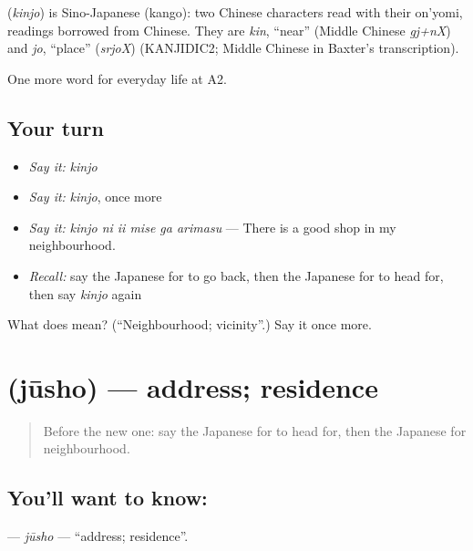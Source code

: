 \begin{cousinweb}
\textbf{} (\emph{kinjo}) is Sino-Japanese (kango): two Chinese characters read with their on'yomi, readings borrowed from Chinese. They are \emph{kin}, \textquotedblleft{}near\textquotedblright{} (Middle Chinese \emph{gj+nX}) and \emph{jo}, \textquotedblleft{}place\textquotedblright{} (\emph{srjoX}) (KANJIDIC2; Middle Chinese in Baxter's transcription).
\end{cousinweb}

\begin{grammarlens}[title={What you've built}]
One more word for everyday life at A2.
\end{grammarlens}

\subsection*{Your turn}
\begin{itemize}
\raggedright
  \item \emph{Say it:} \emph{kinjo}
  \item \emph{Say it:} \emph{kinjo}, once more
  \item \emph{Say it:} \emph{kinjo ni ii mise ga arimasu} — There is a good shop in my neighbourhood.
  \item \emph{Recall:} say the Japanese for to go back, then the Japanese for to head for, then say \emph{kinjo} again
\end{itemize}

\begin{tcolorbox}[breakable,colback=teal!4,colframe=teal!35!black,title={Before you move on}]
What does  mean? (\textquotedblleft{}Neighbourhood; vicinity\textquotedblright{}.) Say it once more.
\end{tcolorbox}
\section[\texorpdfstring{\ja{じゅうしょ} (jūsho)}{じゅうしょ (jūsho)}]{ (jūsho) — address; residence}

\label{lesson:JA-C196-juusho}



\begin{quote}
Before the new one: say the Japanese for to head for, then the Japanese for neighbourhood.
\end{quote}

\subsection*{You'll want to know: }
\textbf{} — \emph{jūsho} — \textquotedblleft{}address; residence\textquotedblright{}.

